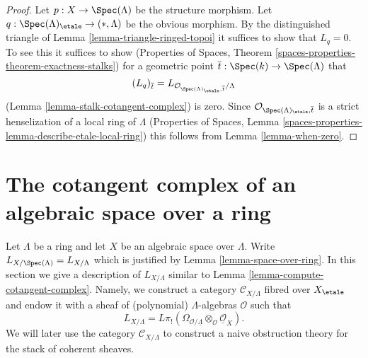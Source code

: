 \begin{proof}
Let $p : X \to \Spec(\Lambda)$ be the structure morphism.
Let $q : \Spec(\Lambda)_\etale \to (*, \Lambda)$
be the obvious morphism. By the distinguished triangle of
Lemma \ref{lemma-triangle-ringed-topoi}
it suffices to show that $L_q = 0$. To see this it suffices to
show
(Properties of Spaces, Theorem
\ref{spaces-properties-theorem-exactness-stalks})
for a geometric point $\overline{t} : \Spec(k) \to \Spec(\Lambda)$ that
$$
(L_q)_{\overline{t}} =
L_{\mathcal{O}_{\Spec(\Lambda)_\etale, \overline{t}}/\Lambda}
$$
(Lemma \ref{lemma-stalk-cotangent-complex})
is zero. Since $\mathcal{O}_{\Spec(\Lambda)_\etale, \overline{t}}$
is a strict henselization of a local ring of $\Lambda$
(Properties of Spaces, Lemma
\ref{spaces-properties-lemma-describe-etale-local-ring})
this follows from Lemma \ref{lemma-when-zero}.
\end{proof}










\section{The cotangent complex of an algebraic space over a ring}
\label{section-cotangent-spaces-variant}

\noindent
Let $\Lambda$ be a ring and let $X$ be an algebraic space over $\Lambda$.
Write $L_{X/\Spec(\Lambda)} = L_{X/\Lambda}$ which is justified
by Lemma \ref{lemma-space-over-ring}.
In this section we give a description of $L_{X/\Lambda}$ similar to
Lemma \ref{lemma-compute-cotangent-complex}.
Namely, we construct a category $\mathcal{C}_{X/\Lambda}$
fibred over $X_\etale$ and endow it with a sheaf of (polynomial)
$\Lambda$-algebras $\mathcal{O}$ such that
$$
L_{X/\Lambda} =
L\pi_!(\Omega_{\mathcal{O}/\underline{\Lambda}} \otimes_\mathcal{O}
\underline{\mathcal{O}}_X).
$$
We will later use the category $\mathcal{C}_{X/\Lambda}$ to construct
a naive obstruction theory for the stack of coherent sheaves.

